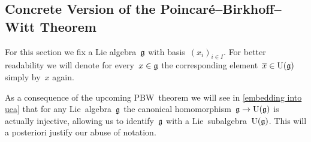 \subsection{Concrete Version of the Poincar\'{e}--Birkhoff--Witt Theorem}


\begin{convention}
  For this section we fix a Lie algebra~$\mathfrak{g}$ with basis~$(x_i)_{i \in I}$.
  For better readability we will denote for every~$x \in \mathfrak{g}$ the corresponding element~$\overline{x} \in \operatorname{U}(\mathfrak{g})$ simply by~$x$ again.
\end{convention}


\begin{remark}
  As a consequence of the upcoming PBW~theorem we will see in \cref{embedding into uea} that for any Lie~algebra~$\mathfrak{g}$ the canonical homomorphism~$\mathfrak{g} \to \operatorname{U}(\mathfrak{g})$ is actually injective, allowing us to identify~$\mathfrak{g}$ with a Lie~subalgebra~$\operatorname{U}(\mathfrak{g})$.
  This will a posteriori justify our abuse of notation.
\end{remark}


